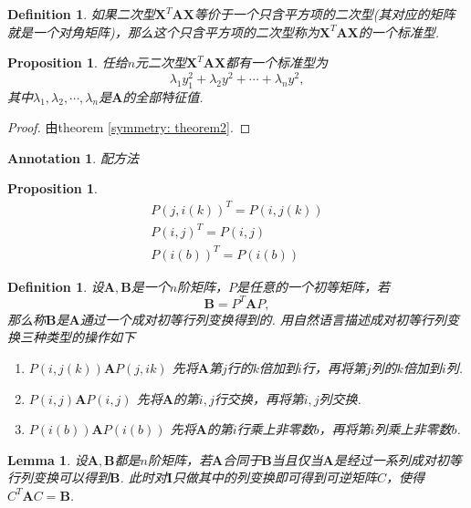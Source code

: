 \documentclass{article}
\newtheorem{lemma}[theorem]{Lemma}
\newtheorem{proposition}[theorem]{Proposition}
\newtheorem{definition}[theorem]{Definition}
\newtheorem{annotation}[theorem]{Annotation}
\newcommand{\mbf}[1]{\bm{#1}}
\begin{document}
\begin{definition}
\rm 如果二次型$\mbf{X}^T\mbf{A}\mbf{X}$等价于一个只含平方项的二次型(其对应的矩阵就是一个对角矩阵)，那么这个只含平方项的二次型称为$\mbf{X}^T\mbf{A}\mbf{X}$的一个{\color{red}标准型}.
\end{definition}

\begin{proposition}
\rm 任给$n$元二次型$\mbf{X}^T\mbf{A}\mbf{X}$都有一个标准型为
$$
\lambda_1y_1^2 + \lambda_2y^2 + \cdots + \lambda_n y^2,
$$
其中$\lambda_1,\lambda_2,\cdots,\lambda_n$是$\mbf{A}$的全部特征值. 
\end{proposition}

\begin{proof}
由theorem \ref{symmetry: theorem2}. 
\end{proof}

\begin{annotation}
\rm {\color{red}配方法}
\end{annotation}

\begin{proposition}
\rm 
$$
\begin{array}{ll}
P(j,i(k))^T = P(i,j(k)) \\
P(i,j)^T = P(i,j) \\
P(i(b))^T = P(i(b)) 
\end{array}
$$
\end{proposition}

\begin{definition}
\rm 设$\mbf{A},\mbf{B}$是一个$n$阶矩阵，$P$是任意的一个初等矩阵，若
$$
\mbf{B} = P^T\mbf{A}P,
$$
那么称$\mbf{B}$是$\mbf{A}$通过一个{\color{red}成对初等行列变换}得到的. 用自然语言描述成对初等行列变换三种类型的操作如下
\begin{enumerate}
	\item $P(i,j(k))\mbf{A}P(j,i{k})$ 先将$\mbf{A}$第$j$行的$k$倍加到$i$行，再将第$j$列的$k$倍加到$i$列.
	\item $P(i,j)\mbf{A}P(i,j)$ 先将$\mbf{A}$的第$i,j$行交换，再将第$i,j$列交换.
	\item $P(i(b))\mbf{A}P(i(b))$ 先将$\mbf{A}$的第$i$行乘上非零数$b$，再将第$i$列乘上非零数$b$.
\end{enumerate}
\end{definition}

\begin{lemma}\label{congruent: lemma1}
\rm 设$\mbf{A},\mbf{B}$都是$n$阶矩阵，若$\mbf{A}$合同于$\mbf{B}$当且仅当$\mbf{A}$是经过一系列成对初等行列变换可以得到$\mbf{B}$. 此时对$\mbf{I}$只做其中的列变换即可得到可逆矩阵$C$，使得$C^T\mbf{A}C = \mbf{B}$.
\end{lemma}
\end{document}
